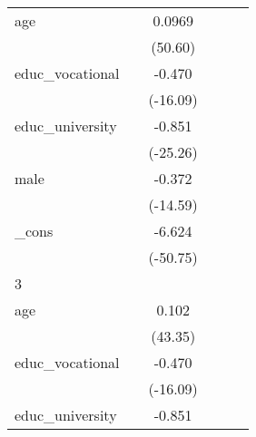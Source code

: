 {\begin{tabular}{l*{5}{c}}
age         &                     &      0.0969\sym{***}&                     &                     &                     \\
            &                     &     (50.60)         &                     &                     &                     \\
[1em]
educ\_vocational&                     &      -0.470\sym{***}&                     &                     &                     \\
            &                     &    (-16.09)         &                     &                     &                     \\
[1em]
educ\_university&                     &      -0.851\sym{***}&                     &                     &                     \\
            &                     &    (-25.26)         &                     &                     &                     \\
[1em]
male        &                     &      -0.372\sym{***}&                     &                     &                     \\
            &                     &    (-14.59)         &                     &                     &                     \\
[1em]
\_cons      &                     &      -6.624\sym{***}&                     &                     &                     \\
            &                     &    (-50.75)         &                     &                     &                     \\
\hline
3           &                     &                     &                     &                     &                     \\
age         &                     &       0.102\sym{***}&                     &                     &                     \\
            &                     &     (43.35)         &                     &                     &                     \\
[1em]
educ\_vocational&                     &      -0.470\sym{***}&                     &                     &                     \\
            &                     &    (-16.09)         &                     &                     &                     \\
[1em]
educ\_university&                     &      -0.851\sym{***}&                     &                     &                     \\

\end{tabular}}
